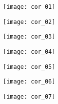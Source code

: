 
\ifprof
\begin{center}
\texttt{[image: cor\_01]}
\end{center}
\begin{center}
\texttt{[image: cor\_02]}
\end{center}
\begin{center}
\texttt{[image: cor\_03]}
\end{center}
\begin{center}
\texttt{[image: cor\_04]}
\end{center}
\begin{center}
\texttt{[image: cor\_05]}
\end{center}
\begin{center}
\texttt{[image: cor\_06]}
\end{center}
\begin{center}
\texttt{[image: cor\_07]}
\end{center}
\else
\fi
